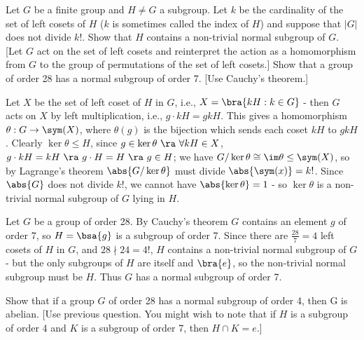 \begin{problem}
Let $G$ be a finite group and $H \neq G$ a subgroup. Let $k$ be the cardinality of the set of left cosets of $H$ ($k$ is sometimes called the index of $H$) and suppose that $|G|$ does not divide $k!$. Show that $H$ contains a non-trivial normal subgroup of $G$. [Let $G$ act on the set of left cosets and reinterpret the action as a homomorphism from $G$ to the group of permutations of the set of left cosets.] Show that a group of order 28 has a normal subgroup of order 7. [Use Cauchy's theorem.]
\end{problem} 

\begin{solution}[\bf Solution.]
Let $X$ be the set of left coset of $H$ in $G$, i.e., $X = \bra{kH:k\in G}$ - then $G$ acts on $X$ by left multiplication, i.e., $g\cdot kH = gk H$. This gives a homomorphism $\theta : G\to \sym(X)$, where $\theta(g)$ is the bijection which sends each coset $kH$ to $gkH$. Clearly $\ker \theta \leq H$, since $g\in \ker\theta \ \ra \ \forall kH \in X$, $g\cdot kH = kH \ \ra \ g\cdot H = H \ \ra \ g\in H$; we have $G/\ker\theta \cong \im \theta \leq \sym(X)$, so by Lagrange's theorem $\abs{G/\ker\theta}$ must divide $\abs{\sym(x)} = k!$. Since $\abs{G}$ does not divide $k!$, we cannot have $\abs{\ker\theta} = 1$ - so $\ker\theta$ is a non-trivial normal subgroup of $G$ lying in $H$.

Let $G$ be a group of order 28. By Cauchy's theorem $G$ contains an element $g$ of order 7, so $H = \bsa{g}$ is a subgroup of order 7. Since there are $\frac{28}7 = 4$ left cosets of $H$ in $G$, and $28\nmid 24 = 4!$, $H$ contains a non-trivial normal subgroup of $G$ - but the only subgroups of $H$ are itself and $\bra{e}$, so the non-trivial normal subgroup must be $H$. Thus $G$ has a normal subgroup of order 7.
\end{solution}

\begin{problem}
Show that if a group $G$ of order 28 has a normal subgroup of order 4, then G is abelian. [Use previous question. You might wish to note that if $H$ is a subgroup of order 4 and $K$ is a subgroup of order 7, then $H \cap K = {e}$.]
\end{problem} 


